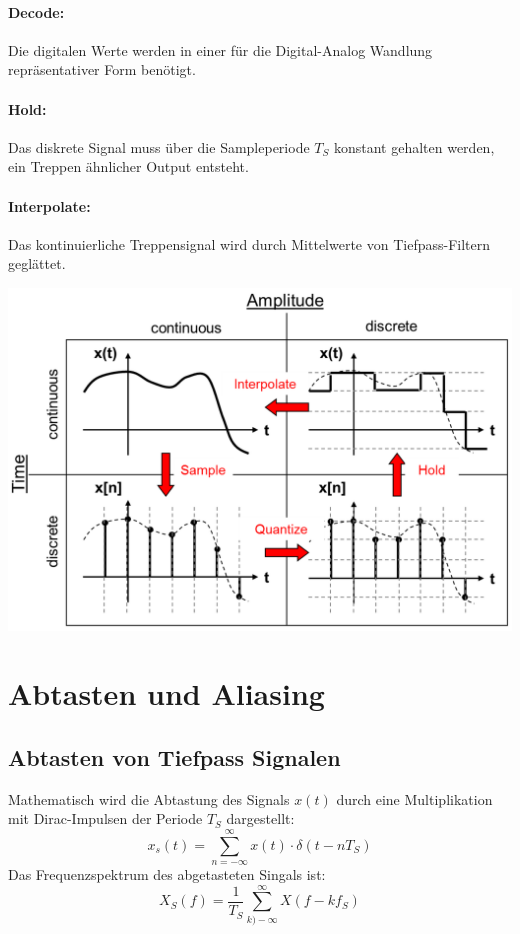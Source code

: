 \paragraph{Decode:} Die digitalen Werte werden in einer für die Digital-Analog
Wandlung repräsentativer Form benötigt.

\paragraph{Hold:} Das diskrete Signal muss über die Sampleperiode $T_S$ konstant
gehalten werden, ein Treppen ähnlicher Output entsteht.

\paragraph{Interpolate:} Das kontinuierliche Treppensignal wird durch Mittelwerte
von Tiefpass-Filtern geglättet.

\begin{center}
	\includegraphics[scale=.7]{./images/ad_da}
\end{center}

\section{Abtasten und Aliasing}
\subsection{Abtasten von Tiefpass Signalen}
Mathematisch wird die Abtastung des Signals $x(t)$ durch eine Multiplikation
mit Dirac-Impulsen der Periode $T_S$ dargestellt:
\[ x_s(t) = \sum_{n=-\infty}^{\infty} x(t) \cdot \delta(t-nT_S) \]
Das Frequenzspektrum des abgetasteten Singals ist:
\[ X_S(f) = \frac{1}{T_S} \sum_{k)-\infty}^{\infty} X(f-kf_S) \]

